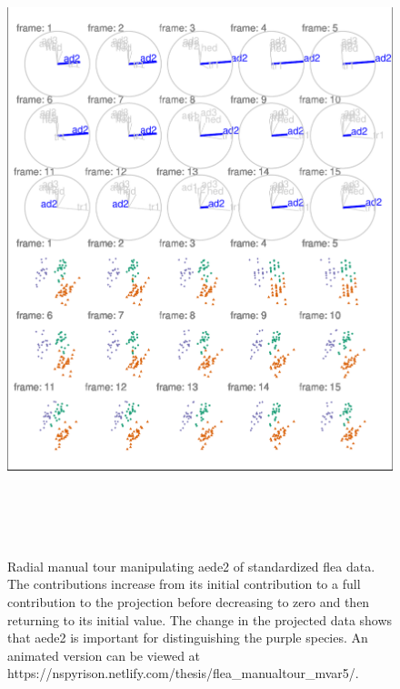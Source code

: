 \begin{Schunk}
\begin{figure}

{\centering \includegraphics[width=6in,height=7.2in]{spinifex_paper_files/figure-latex/step3-1} 

}

\caption[Radial manual tour manipulating aede2 of standardized flea data]{Radial manual tour manipulating aede2 of standardized flea data.  The contributions increase from its initial contribution to a full contribution to the projection before decreasing to zero and then returning to its initial value. The change in the projected data shows that aede2 is important for distinguishing the purple species. An animated version can be viewed at  https://nspyrison.netlify.com/thesis/flea\_manualtour\_mvar5/.}\label{fig:step3}
\end{figure}
\end{Schunk}

